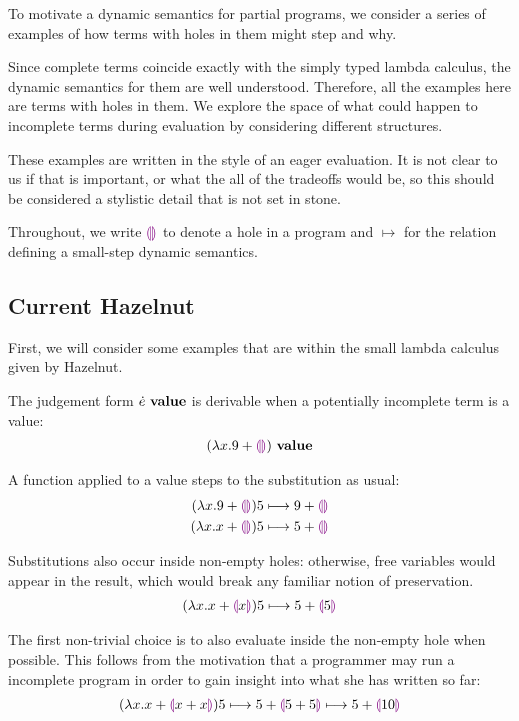 To motivate a dynamic semantics for partial programs, we consider a series
of examples of how terms with holes in them might step and why.

Since complete terms coincide exactly with the simply typed lambda
calculus, the dynamic semantics for them are well understood. Therefore,
all the examples here are terms with holes in them. We explore the space of
what could happen to incomplete terms during evaluation by considering
different structures.

These examples are written in the style of an eager evaluation. It is not
clear to us if that is important, or what the all of the tradeoffs would
be, so this should be considered a stylistic detail that is not set in
stone.

Throughout, we write $\textcolor{violet}{\llparenthesis}\textcolor{violet}{\rrparenthesis}$ to denote a hole in a program and $\mapsto$
for the relation defining a small-step dynamic semantics.

\subsection{Current Hazelnut}
First, we will consider some examples that are within the small lambda
calculus given by Hazelnut.

The judgement form ${\dot{e}} ~\mathbf{value}$ is derivable when a potentially
incomplete term is a value:
\begin{align*}
  {(\lambda x. 9 + \textcolor{violet}{\llparenthesis}\textcolor{violet}{\rrparenthesis})} ~\mathbf{value}
\end{align*}

A function applied to a value steps to the substitution as usual:
\begin{align*}
  {
        (\lambda x.9 + \textcolor{violet}{\llparenthesis}\textcolor{violet}{\rrparenthesis})5
      } \longmapsto {
        9 + \textcolor{violet}{\llparenthesis}\textcolor{violet}{\rrparenthesis}}
      \\
      {
        (\lambda x.x + \textcolor{violet}{\llparenthesis}\textcolor{violet}{\rrparenthesis})5
      } \longmapsto {
        5 + \textcolor{violet}{\llparenthesis}\textcolor{violet}{\rrparenthesis}}
\end{align*}

Substitutions also occur inside non-empty holes: otherwise, free variables
would appear in the result, which would break any familiar notion of
preservation.
\begin{align*}
  {
        (\lambda x.x + \textcolor{violet}{\llparenthesis}x\textcolor{violet}{\rrparenthesis})5
      } \longmapsto {
        5 + \textcolor{violet}{\llparenthesis}5\textcolor{violet}{\rrparenthesis}}
\end{align*}

The first non-trivial choice is to also evaluate inside the non-empty hole
when possible.
%
%
This follows from the motivation that a programmer may run a incomplete
program in order to gain insight into what she has written so far:
\begin{align*}
  {
    {
          (\lambda x.x + \textcolor{violet}{\llparenthesis}x + x\textcolor{violet}{\rrparenthesis})5
        } \longmapsto {
          5 + \textcolor{violet}{\llparenthesis}5 + 5\textcolor{violet}{\rrparenthesis}}
  } \longmapsto {5 + \textcolor{violet}{\llparenthesis}10\textcolor{violet}{\rrparenthesis}}
\end{align*}


